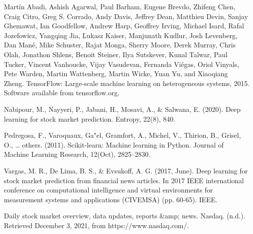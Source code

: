 \documentclass{article}
\begin{document}
\begin{hangparas}{0.25in}{1}
Martín Abadi, Ashish Agarwal, Paul Barham, Eugene Brevdo,
Zhifeng Chen, Craig Citro, Greg S. Corrado, Andy Davis,
Jeffrey Dean, Matthieu Devin, Sanjay Ghemawat, Ian Goodfellow,
Andrew Harp, Geoffrey Irving, Michael Isard, Rafal Jozefowicz, Yangqing Jia,
Lukasz Kaiser, Manjunath Kudlur, Josh Levenberg, Dan Mané, Mike Schuster,
Rajat Monga, Sherry Moore, Derek Murray, Chris Olah, Jonathon Shlens,
Benoit Steiner, Ilya Sutskever, Kunal Talwar, Paul Tucker,
Vincent Vanhoucke, Vijay Vasudevan, Fernanda Viégas,
Oriol Vinyals, Pete Warden, Martin Wattenberg, Martin Wicke,
Yuan Yu, and Xiaoqiang Zheng.
TensorFlow: Large-scale machine learning on heterogeneous systems,
2015. Software available from tensorflow.org.

Nabipour, M., Nayyeri, P., Jabani, H., Mosavi, A., \& Salwana, E. (2020). Deep learning for stock market prediction. Entropy, 22(8), 840.

Pedregosa, F., Varoquaux, Ga"el, Gramfort, A., Michel, V., Thirion, B., Grisel, O., … others. (2011). Scikit-learn: Machine learning in Python. Journal of Machine Learning Research, 12(Oct), 2825–2830.

Vargas, M. R., De Lima, B. S., \& Evsukoff, A. G. (2017, June). Deep learning for stock market prediction from financial news articles. In 2017 IEEE international conference on computational intelligence and virtual environments for measurement systems and applications (CIVEMSA) (pp. 60-65). IEEE.

Daily stock market overview, data updates, reports \&amp; news. Nasdaq. (n.d.). Retrieved December 3, 2021, from https://www.nasdaq.com/.
\end{hangparas}
\end{document}
